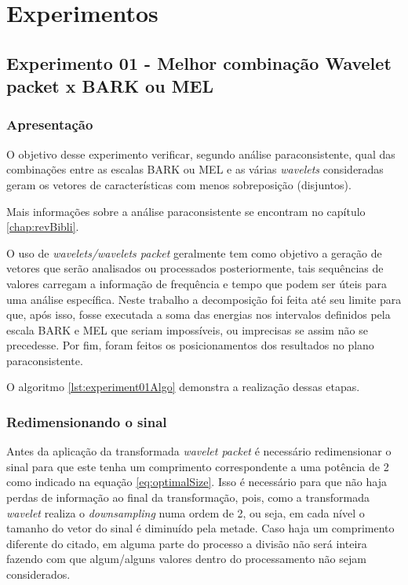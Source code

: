 	\section{Experimentos}
		\subsection{Experimento 01 - Melhor combinação Wavelet packet x BARK ou MEL}
		\label{chap:propApproach:sec:Experimento01}
			\subsubsection{Apresentação}
				\par O objetivo desse experimento verificar, segundo análise paraconsistente, qual das combinações entre as escalas BARK ou MEL e as várias \textit{wavelets} consideradas geram os vetores de características com menos sobreposição (disjuntos).
				
				\par Mais informações sobre a análise paraconsistente se encontram no capítulo \ref{chap:revBibli}. 
				
				\par O uso de \textit{wavelets/wavelets packet} geralmente tem como objetivo a geração de vetores que serão analisados ou processados posteriormente, tais sequências de valores carregam a informação de frequência e tempo que podem ser úteis para uma análise específica. Neste trabalho a decomposição foi feita até seu limite  para que, após isso, fosse executada a soma das energias nos intervalos definidos pela escala BARK e MEL que seriam impossíveis, ou imprecisas se assim não se precedesse. Por fim, foram  feitos os posicionamentos dos resultados no plano paraconsistente.
				
				\par O algoritmo \ref{lst:experiment01Algo} demonstra a realização dessas etapas.
			
			\subsubsection{Redimensionando o sinal}
				\par Antes da aplicação da transformada \textit{wavelet packet} é necessário redimensionar o sinal para que este tenha um comprimento correspondente a uma potência de 2 como indicado na equação \ref{eq:optimalSize}. Isso é necessário para que não haja perdas de informação ao final da transformação, pois, como a transformada \textit{wavelet} realiza o \textit{downsampling} numa ordem de 2, ou seja, em cada nível o tamanho do vetor do sinal é diminuído pela metade. Caso haja um comprimento diferente do citado, em alguma parte do processo a divisão não será inteira fazendo com que algum/alguns valores dentro do processamento não sejam considerados.
				
